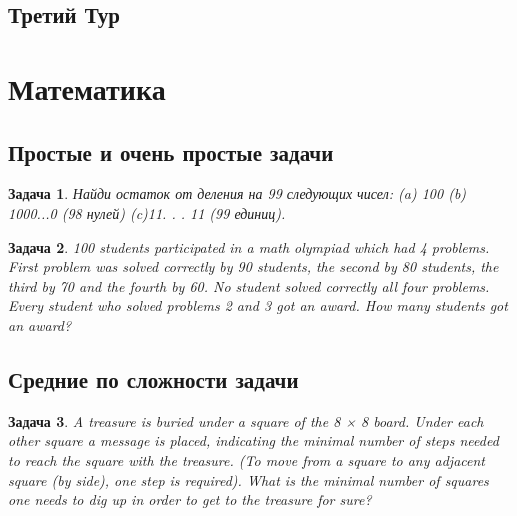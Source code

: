 \documentclass[12pt]{article}
\theoremstyle{break}
\newtheorem{problem}{Задача}[subsection]
\begin{document}
\newpage
\subsection{Третий Тур}






\newpage
\section{Математика}


\subsection{Простые и очень простые задачи}



\begin{problem}
Найди остаток от деления на 99 следующих чисел: (a) 100 (b) 1000...0 (98 нулей) (c)11. . . 11 (99 единиц).
\end{problem}


\begin{problem}
100 students participated in a math olympiad which had 4 problems. First problem was solved correctly by 90 students, the second by 80 students, the third by 70 and the fourth by 60. No student solved correctly all four problems.
Every student who solved problems 2 and 3 got an award. How many students got an award?
\end{problem}



\subsection{Средние по сложности задачи}


\begin{problem}
A treasure is buried under a square of the 8 × 8 board. Under each other square a message is placed, indicating the minimal number of steps needed to reach the square with the treasure. (To move from a square to any adjacent square (by side), one step is required). What is the minimal number of squares one needs to dig up in order to get to the treasure for sure?
\end{problem}
\end{document}
